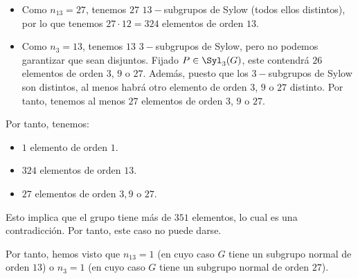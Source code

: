 \begin{ejercicio}
\begin{enumerate}
\begin{itemize}
\begin{itemize}
                \begin{itemize}
                    \item Como $n_{13}=27$, tenemos $27$ $13-$subgrupos de Sylow (todos ellos distintos), por lo que tenemos $27\cdot 12=324$ elementos de orden $13$.
                    \item Como $n_3=13$, tenemos $13$ $3-$subgrupos de Sylow, pero no podemos garantizar que sean disjuntos. Fijado $P\in \Syl_3(G)$, este contendrá $26$ elementos de orden $3$, $9$ o $27$. Además, puesto que los $3-$subgrupos de Sylow son distintos, al menos habrá otro elemento de orden $3$, $9$ o $27$ distinto. Por tanto, tenemos al menos $27$ elementos de orden $3$, $9$ o $27$.
                \end{itemize}
                Por tanto, tenemos:
                \begin{itemize}
                    \item $1$ elemento de orden $1$.
                    \item $324$ elementos de orden $13$.
                    \item $27$ elementos de orden $3,9$ o $27$.
                \end{itemize}
                Esto implica que el grupo tiene más de $351$ elementos, lo cual es una contradicción. Por tanto, este caso no puede darse.
            \end{itemize}
        \end{itemize}

        Por tanto, hemos visto que $n_{13}=1$ (en cuyo caso $G$ tiene un subgrupo normal de orden $13$) o $n_3=1$ (en cuyo caso $G$ tiene un subgrupo normal de orden $27$).
    \end{enumerate}
\end{ejercicio}

